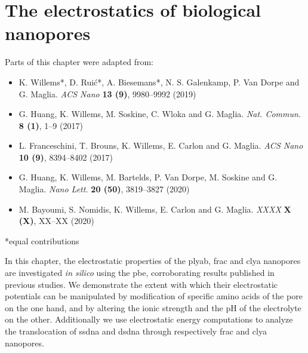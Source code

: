 %
\chapter{The electrostatics of biological nanopores}
%
\label{ch:electrostatics}
%
%
%
%

%
%
\begin{shaded}
Parts of this chapter were adapted from:
%
\begin{itemize}
  \item K. Willems*, D. Rui\'{c}*, A. Biesemans*, N. S. Galenkamp, P. Van Dorpe and G. Maglia.
        \textit{ACS Nano} \textbf{13 (9)}, 9980--9992 (2019) %
  \item G. Huang, K. Willems, M. Soskine, C. Wloka and G. Maglia.
        \textit{Nat. Commun.} \textbf{8 (1)}, 1--9 (2017) %
  \item L. Franceschini,  T. Brouns, K. Willems, E. Carlon and G. Maglia.
        \textit{ACS Nano} \textbf{10 (9)}, 8394--8402 (2017) %
  \item G. Huang, K. Willems, M. Bartelds, P. Van Dorpe, M. Soskine and G. Maglia.
        \textit{Nano Lett.} \textbf{20 (50)}, 3819--3827 (2020) %
  \item M. Bayoumi, S. Nomidis, K. Willems, E. Carlon and G. Maglia.
        \textit{XXXX} \textbf{X (X)}, XX--XX (2020) %
\end{itemize}
%
*equal contributions
%
\newpage
\end{shaded}
%
%

\glsresetall
%


In this chapter, the electrostatic properties of the \gls{plyab}, \gls{frac} and \gls{clya} nanopores are
investigated \textit{in silico} using the \gls{pbe}, corroborating results published in previous studies. We
demonstrate the extent with which their electrostatic potentials can be manipulated by modification of
specific amino acids of the pore on the one hand, and by altering the ionic strength and the pH of the
electrolyte on the other. Additionally we use electrostatic energy computations to analyze the translocation
of \gls{ssdna} and \gls{dsdna} through respectively \gls{frac} and \gls{clya} nanopores. \\
%

